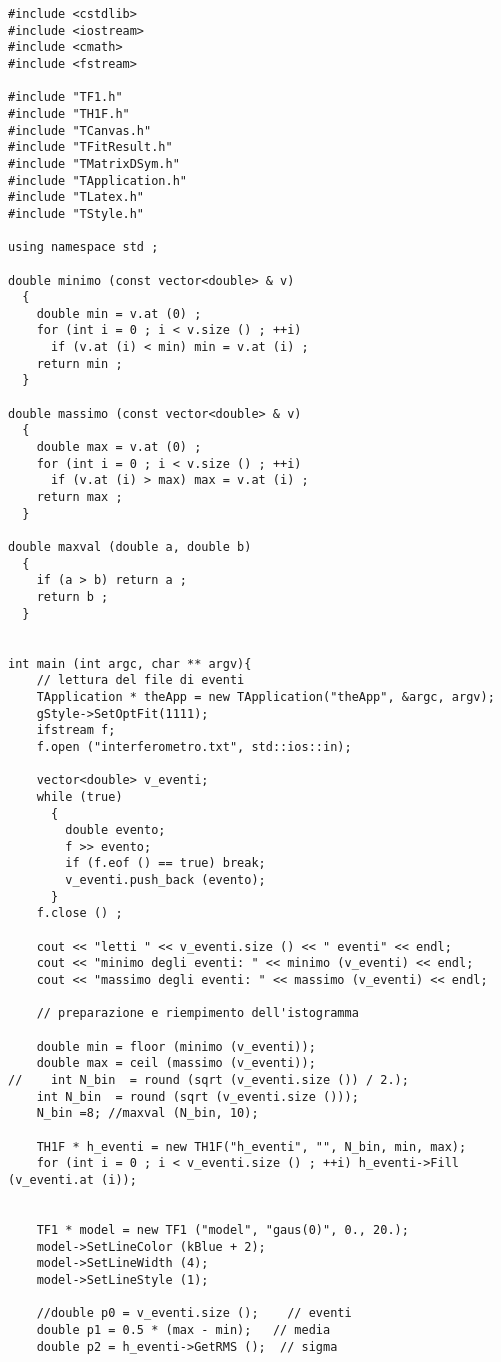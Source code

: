\begin{lstlisting}
#include <cstdlib>
#include <iostream>
#include <cmath>
#include <fstream>

#include "TF1.h"
#include "TH1F.h"
#include "TCanvas.h"
#include "TFitResult.h"
#include "TMatrixDSym.h"
#include "TApplication.h"
#include "TLatex.h"
#include "TStyle.h"

using namespace std ;

double minimo (const vector<double> & v)
  {
    double min = v.at (0) ;
    for (int i = 0 ; i < v.size () ; ++i)
      if (v.at (i) < min) min = v.at (i) ;
    return min ;
  }

double massimo (const vector<double> & v)
  {
    double max = v.at (0) ;
    for (int i = 0 ; i < v.size () ; ++i)
      if (v.at (i) > max) max = v.at (i) ;
    return max ;
  }

double maxval (double a, double b)
  {
    if (a > b) return a ;
    return b ;
  }


int main (int argc, char ** argv){
    // lettura del file di eventi
    TApplication * theApp = new TApplication("theApp", &argc, argv);
    gStyle->SetOptFit(1111);
    ifstream f;
    f.open ("interferometro.txt", std::ios::in);

    vector<double> v_eventi;
    while (true)
      {
        double evento;
        f >> evento;
        if (f.eof () == true) break;
        v_eventi.push_back (evento);
      }
    f.close () ;

    cout << "letti " << v_eventi.size () << " eventi" << endl;
    cout << "minimo degli eventi: " << minimo (v_eventi) << endl;
    cout << "massimo degli eventi: " << massimo (v_eventi) << endl;

    // preparazione e riempimento dell'istogramma

    double min = floor (minimo (v_eventi));
    double max = ceil (massimo (v_eventi));
//    int N_bin  = round (sqrt (v_eventi.size ()) / 2.);
    int N_bin  = round (sqrt (v_eventi.size ()));
    N_bin =8; //maxval (N_bin, 10);

    TH1F * h_eventi = new TH1F("h_eventi", "", N_bin, min, max);
    for (int i = 0 ; i < v_eventi.size () ; ++i) h_eventi->Fill (v_eventi.at (i));


    TF1 * model = new TF1 ("model", "gaus(0)", 0., 20.);
    model->SetLineColor (kBlue + 2);
    model->SetLineWidth (4);
    model->SetLineStyle (1);

    //double p0 = v_eventi.size ();    // eventi
    double p1 = 0.5 * (max - min);   // media
    double p2 = h_eventi->GetRMS ();  // sigma


\end{lstlisting}
